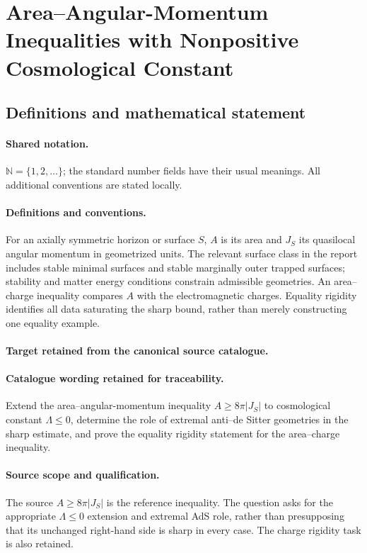 \documentclass[11pt]{article}
\begin{document}
\section{Area–Angular-Momentum Inequalities with Nonpositive Cosmological Constant}\label{statement}

\subsection{Definitions and mathematical statement}

\paragraph{Shared notation.}$\mathbb N=\{1,2,\ldots\}$; the standard number fields have their usual meanings. All additional conventions are stated locally.


\paragraph{Definitions and conventions.}
For an axially symmetric horizon or surface $S$, $A$ is its area and $J_S$ its quasilocal angular momentum in geometrized units. The relevant surface class in the report includes stable minimal surfaces and stable marginally outer trapped surfaces; stability and matter energy conditions constrain admissible geometries. An area--charge inequality compares $A$ with the electromagnetic charges. Equality rigidity identifies all data saturating the sharp bound, rather than merely constructing one equality example.

\paragraph{Target retained from the canonical source catalogue.}
\paragraph{Catalogue wording retained for traceability.}
Extend the area–angular-momentum inequality $A\geq8\pi|J_S|$ to cosmological constant $\Lambda\leq0$, determine the role of extremal anti–de Sitter geometries in the sharp estimate, and prove the equality rigidity statement for the area–charge inequality.

\paragraph{Source scope and qualification.}
The source $A\geq8\pi|J_S|$ is the reference inequality. The question asks for the appropriate $\Lambda\leq0$ extension and extremal AdS role, rather than presupposing that its unchanged right-hand side is sharp in every case. The charge rigidity task is also retained.
\end{document}
